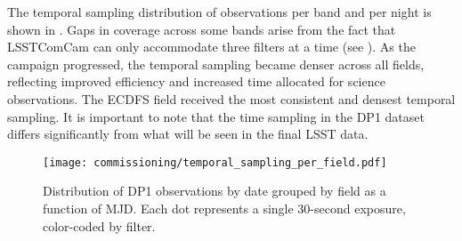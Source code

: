 The temporal sampling distribution of observations per band and per night is shown in .
Gaps in coverage across some bands arise from the fact that \gls{LSSTComCam} can only accommodate three filters at a time (see ).
As the campaign progressed, the temporal sampling became denser across all fields, reflecting improved efficiency and increased time allocated for science observations.
The \gls{ECDFS} field received the most consistent and densest temporal sampling.
It is important to note that the time sampling in the \gls{DP1} dataset differs significantly from what will be seen in the final \gls{LSST} data.
\begin{figure}[htb!]
\centering
\texttt{[image: commissioning/temporal\_sampling\_per\_field.pdf]}
\caption{Distribution of DP1 observations by date grouped by field as a function of MJD.  Each dot represents a single 30-second exposure, color-coded by filter.}	
\label{fig:target_fields_temporal_sampling}
\vspace{0.1cm}
\end{figure}

